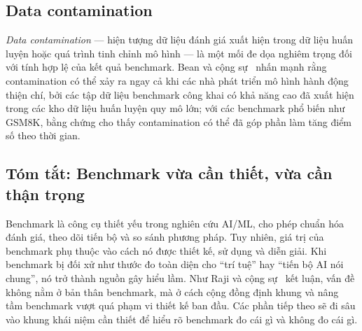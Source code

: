 \subsection{Data contamination}

\textit{Data contamination} --- hiện tượng dữ liệu đánh giá xuất hiện trong dữ liệu huấn luyện hoặc quá trình tinh chỉnh mô hình --- là một mối đe dọa nghiêm trọng đối với tính hợp lệ của kết quả benchmark. Bean và cộng sự~\cite{measuring_what_matters} nhấn mạnh rằng contamination có thể xảy ra ngay cả khi các nhà phát triển mô hình hành động thiện chí, bởi các tập dữ liệu benchmark công khai có khả năng cao đã xuất hiện trong các kho dữ liệu huấn luyện quy mô lớn; với các benchmark phổ biến như GSM8K, bằng chứng cho thấy contamination có thể đã góp phần làm tăng điểm số theo thời gian.

\subsection{Tóm tắt: Benchmark vừa cần thiết, vừa cần thận trọng}

Benchmark là công cụ thiết yếu trong nghiên cứu AI/ML, cho phép chuẩn hóa đánh giá, theo dõi tiến bộ và so sánh phương pháp. Tuy nhiên, giá trị của benchmark phụ thuộc vào cách nó được thiết kế, sử dụng và diễn giải. Khi benchmark bị đối xử như thước đo toàn diện cho ``trí tuệ'' hay ``tiến bộ AI nói chung'', nó trở thành nguồn gây hiểu lầm. Như Raji và cộng sự~\cite{everything_benchmark} kết luận, vấn đề không nằm ở bản thân benchmark, mà ở cách cộng đồng định khung và nâng tầm benchmark vượt quá phạm vi thiết kế ban đầu. Các phần tiếp theo sẽ đi sâu vào khung khái niệm cần thiết để hiểu rõ benchmark đo cái gì và không đo cái gì.